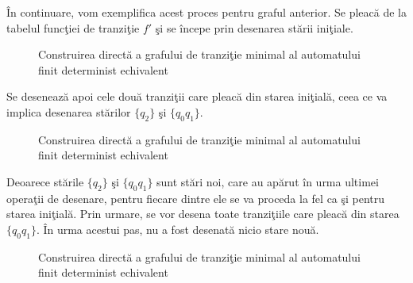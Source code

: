 În continuare, vom exemplifica acest proces pentru graful anterior. Se pleacă de la tabelul funcţiei de tranziţie $ f' $ şi se începe prin desenarea stării iniţiale.

\begin{figure}[H]
\centering
{}
\caption{Construirea directă a grafului de tranziţie minimal al automatului finit determinist echivalent}
\end{figure}

Se desenează apoi cele două tranziţii care pleacă din starea iniţială, ceea ce va implica desenarea stărilor $\{q_2\}$ şi $\{q_0 q_1\}$.

\begin{figure}[H]
\centering
{}
\caption{Construirea directă a grafului de tranziţie minimal al automatului finit determinist echivalent}
\end{figure}

Deoarece stările $\{q_2\}$ şi $\{q_0 q_1\}$ sunt stări noi, care au apărut în urma ultimei operaţii de desenare, pentru fiecare dintre ele se va proceda la fel ca şi pentru starea iniţială. Prin urmare, se vor desena toate tranziţiile care pleacă din starea  $\{q_0 q_1\}$. În urma acestui pas, nu a fost desenată nicio stare nouă.

\begin{figure}[H]
\centering
{}
\caption{Construirea directă a grafului de tranziţie minimal al automatului finit determinist echivalent}
\end{figure}

